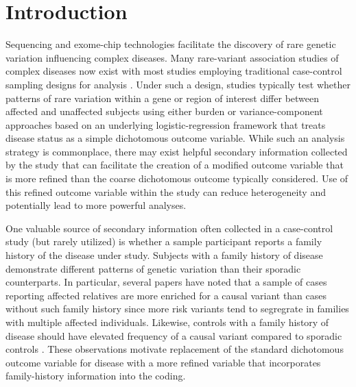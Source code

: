 \documentclass[]{article}
\theoremstyle{definition}
\theoremstyle{definition}
\theoremstyle{definition}
\theoremstyle{remark}
\begin{document}
\pagebreak

\hypertarget{introduction}{%
\section{Introduction}\label{introduction}}

Sequencing and exome-chip technologies facilitate the discovery of rare
genetic variation influencing complex diseases. Many rare-variant
association studies of complex diseases now exist with most studies
employing traditional case-control sampling designs for analysis
\citep{DeRubeis2014, Sanders2017}. Under such a design, studies
typically test whether patterns of rare variation within a gene or
region of interest differ between affected and unaffected subjects using
either burden \citep{Li2008} or variance-component \citep{Wu2011}
approaches based on an underlying logistic-regression framework that
treats disease status as a simple dichotomous outcome variable. While
such an analysis strategy is commonplace, there may exist helpful
secondary information collected by the study that can facilitate the
creation of a modified outcome variable that is more refined than the
coarse dichotomous outcome typically considered. Use of this refined
outcome variable within the study can reduce heterogeneity and
potentially lead to more powerful analyses.

One valuable source of secondary information often collected in a
case-control study (but rarely utilized) is whether a sample participant
reports a family history of the disease under study. Subjects with a
family history of disease demonstrate different patterns of genetic
variation than their sporadic counterparts. In particular, several
papers have noted that a sample of cases reporting affected relatives
are more enriched for a causal variant than cases without such family
history \citep{TengRisch1999, Zollner2012, Epstein2015} since more risk
variants tend to segregrate in families with multiple affected
individuals. Likewise, controls with a family history of disease should
have elevated frequency of a causal variant compared to sporadic
controls \citep{Liu2017}. These observations motivate replacement of the
standard dichotomous outcome variable for disease with a more refined
variable that incorporates family-history information into the coding.
\end{document}
